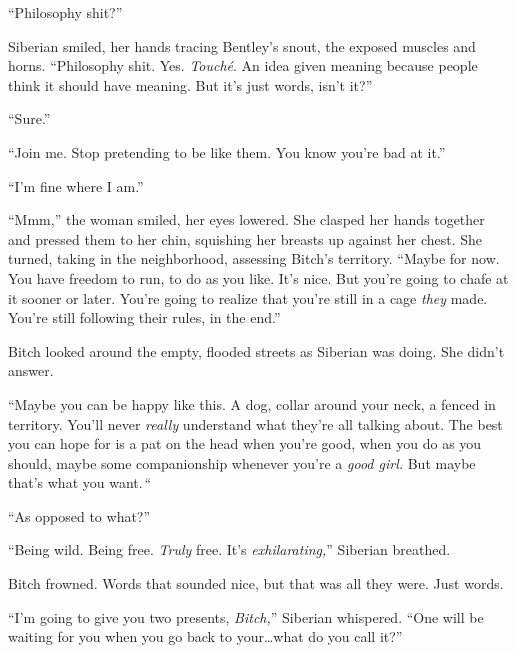 ``Philosophy shit?''



Siberian smiled, her hands tracing Bentley's snout, the exposed muscles and horns.  ``Philosophy shit.  Yes.  \emph{Touch\'{e}}.  An idea given meaning because people think it should have meaning.  But it's just words, isn't it?''



``Sure.''



``Join me.  Stop pretending to be like them.  You know you're bad at it.''



``I'm fine where I am.''



``Mmm,'' the woman smiled, her eyes lowered.  She clasped her hands together and pressed them to her chin, squishing her breasts up against her chest.  She turned, taking in the neighborhood, assessing Bitch's territory.  ``Maybe for now.  You have freedom to run, to do as you like.  It's nice.  But you're going to chafe at it sooner or later.  You're going to realize that you're still in a cage \emph{they} made.  You're still following their rules, in the end.''



Bitch looked around the empty, flooded streets as Siberian was doing.  She didn't answer.



``Maybe you can be happy like this.  A dog, collar around your neck, a fenced in territory.  You'll never \emph{really} understand what they're all talking about.  The best you can hope for is a pat on the head when you're good, when you do as you should, maybe some companionship whenever you're a \emph{good girl.  }But maybe that's what you want.\emph{``}



``As opposed to what?''



``Being wild.  Being free.  \emph{Truly} free.  It's \emph{exhilarating,}'' Siberian breathed.



Bitch frowned.  Words that sounded nice, but that was all they were.  Just words.



``I'm going to give you two presents, \emph{Bitch,}'' Siberian whispered.  ``One will be waiting for you when you go back to your\ldots what do you call it?''



